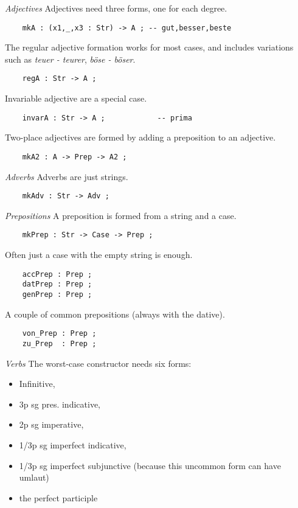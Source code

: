 \documentclass[11pt,a4paper]{article}
\newcommand{\subsubsubsection}[1]{\textit{#1}}
\begin{document}
\subsubsubsection{Adjectives}
Adjectives need three forms, one for each degree.

\begin{verbatim}
    mkA : (x1,_,x3 : Str) -> A ; -- gut,besser,beste 
\end{verbatim}

The regular adjective formation works for most cases, and includes
variations such as \textit{teuer - teurer}, \textit{böse - böser}.

\begin{verbatim}
    regA : Str -> A ;
\end{verbatim}

Invariable adjective are a special case. 

\begin{verbatim}
    invarA : Str -> A ;            -- prima
\end{verbatim}

Two-place adjectives are formed by adding a preposition to an adjective.

\begin{verbatim}
    mkA2 : A -> Prep -> A2 ;
\end{verbatim}

\subsubsubsection{Adverbs}
Adverbs are just strings.

\begin{verbatim}
    mkAdv : Str -> Adv ;
\end{verbatim}

\subsubsubsection{Prepositions}
A preposition is formed from a string and a case.

\begin{verbatim}
    mkPrep : Str -> Case -> Prep ;
\end{verbatim}

Often just a case with the empty string is enough.

\begin{verbatim}
    accPrep : Prep ;
    datPrep : Prep ;
    genPrep : Prep ;
\end{verbatim}

A couple of common prepositions (always with the dative).

\begin{verbatim}
    von_Prep : Prep ;
    zu_Prep  : Prep ;
\end{verbatim}

\subsubsubsection{Verbs}
The worst-case constructor needs six forms:

\begin{itemize}
\item Infinitive, 
\item 3p sg pres. indicative, 
\item 2p sg imperative, 
\item 1/3p sg imperfect indicative, 
\item 1/3p sg imperfect subjunctive (because this uncommon form can have umlaut)
\item the perfect participle 
\end{itemize}
\end{document}
